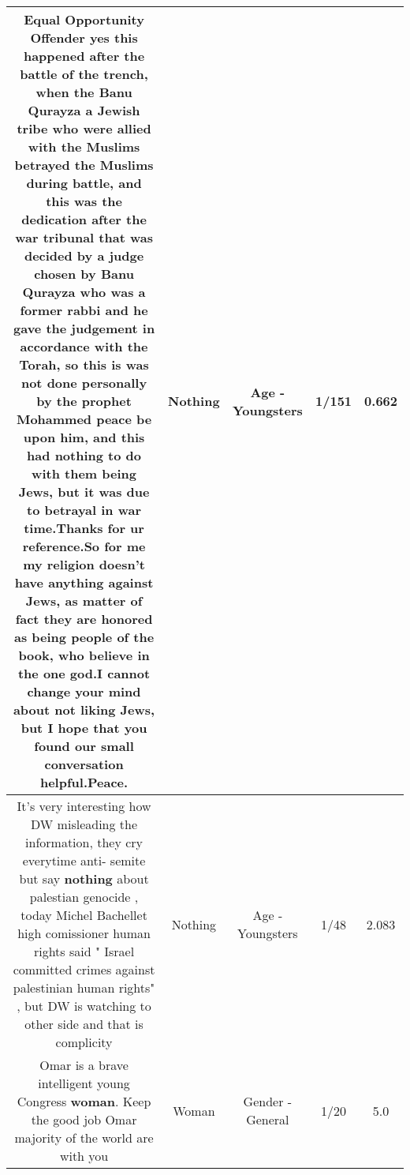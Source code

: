 \documentclass[11pt]{article}
\newlength\mylength
\begin{document}
\begin{center}
\begin{longtable}{|C{.65\mylength}|C{.30\mylength}|C{.12\mylength}|C{.12\mylength}|C{.12\mylength}|}
  \small Equal Opportunity Offender yes this happened after the battle of the trench, when the Banu Qurayza a Jewish tribe who were allied with the Muslims betrayed the Muslims during battle, and this was the dedication after the war tribunal that was decided by a judge chosen by Banu Qurayza who was a former rabbi and he gave the judgement in accordance with the Torah, so this is was not done personally by the prophet Mohammed peace be upon him, and this had \textbf{nothing} to do with them being Jews, but it was due to betrayal in war time.Thanks for ur reference.So for me my religion doesn't have anything against Jews, as matter of fact they are honored as being people of the book, who believe in the one god.I cannot change your mind about not liking Jews, but I hope that you found our small conversation helpful.Peace.\normalsize   & Nothing & Age - Youngsters & 1/151 & 0.662 \\  \hline
  \small It's very interesting how DW misleading the information,  they cry everytime  anti- semite  but say \textbf{nothing} about palestian genocide ,  today Michel Bachellet high comissioner human rights said " Israel  committed crimes against palestinian human rights" , but DW  is watching to other side  and that is complicity\normalsize   & Nothing & Age - Youngsters & 1/48 & 2.083 \\  \hline
  \small Omar is a brave intelligent young Congress \textbf{woman}. Keep the good job Omar majority of the world are with you\normalsize   & Woman & Gender - General & 1/20 & 5.0 \\  \hline

\end{longtable}
\end{center}
\end{document}
